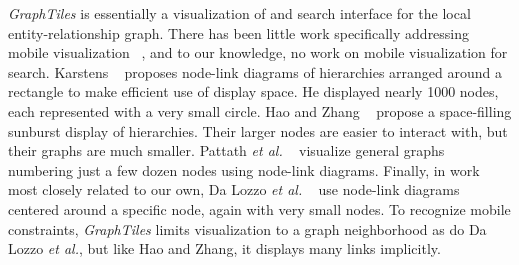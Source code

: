 \textit{GraphTiles} is essentially a visualization of and search interface for the local entity-relationship graph. There has been little work specifically addressing mobile visualization ~\cite{RefWorks:658}, and to our knowledge, no work on mobile visualization for search. Karstens ~\cite{RefWorks:908} proposes node-link diagrams of hierarchies arranged around a rectangle to make efficient use of display space. He displayed nearly 1000 nodes, each represented with a very small circle. Hao and Zhang ~\cite{RefWorks:906} propose a space-filling sunburst display of hierarchies. Their larger nodes are easier to interact with, but their graphs are much smaller. Pattath \textit{et al.} ~\cite{RefWorks:896} visualize general graphs numbering just a few dozen nodes using node-link diagrams. Finally, in work most closely related to our own, Da Lozzo \textit{et al.} ~\cite{springerlink:10.1007/978-3-642-18469-7-14} use node-link diagrams centered around a specific node, again with very small nodes. To recognize mobile constraints, \textit{GraphTiles} limits visualization to a graph neighborhood as do Da Lozzo \textit{et al.}, but like Hao and Zhang, it displays many links implicitly.